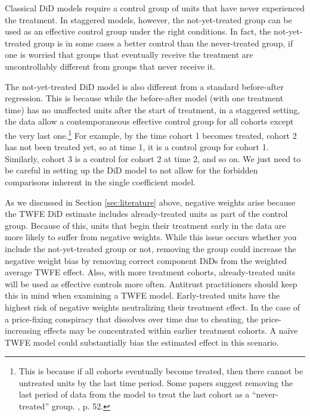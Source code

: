 \documentclass[12pt]{article}
\begin{document}
Classical DiD models require a control group of units that have never experienced the treatment. In staggered models, however, the not-yet-treated group can be used as an effective control group under the right conditions. In fact, the not-yet-treated group is in some cases a better control than the never-treated group, if one is worried that groups that eventually receive the treatment are uncontrollably different from groups that never receive it.

The not-yet-treated DiD model is also different from a standard before-after regression. This is because while the before-after model (with one treatment time) has no unaffected units after the start of treatment, in a staggered setting, the data allow a contemporaneous effective control group for all cohorts except the very last one.\footnote{This is because if all cohorts eventually become treated, then there cannot be untreated units by the last time period. Some papers suggest removing the last period of data from the model to treat the last cohort as a “never-treated” group. \citet{wooldridge2021two}, p. 52.}  For example, by the time cohort 1 becomes treated, cohort 2 has not been treated yet, so at time 1, it is a control group for cohort 1. Similarly, cohort 3 is a control for cohort 2 at time 2, and so on. We just need to be careful in setting up the DiD model to not allow for the forbidden comparisons inherent in the single coefficient model.

As we discussed in Section \ref{sec:literature} above, negative weights arise because the TWFE DiD estimate includes already-treated units as part of the control group.  Because of this, units that begin their treatment early in the data are more likely to suffer from negative weights. While this issue occurs whether you include the not-yet-treated group or not, removing the group could increase the negative weight bias by removing correct component DiDs from the weighted average TWFE effect. Also, with more treatment cohorts, already-treated units will be used as effective controls more often. Antitrust practitioners should keep this in mind when examining a TWFE model. Early-treated units have the highest risk of negative weights neutralizing their treatment effect. In the case of a price-fixing conspiracy that dissolves over time due to cheating, the price-increasing effects may be concentrated within earlier treatment cohorts. A naïve TWFE model could substantially bias the estimated effect in this scenario.
\end{document}
